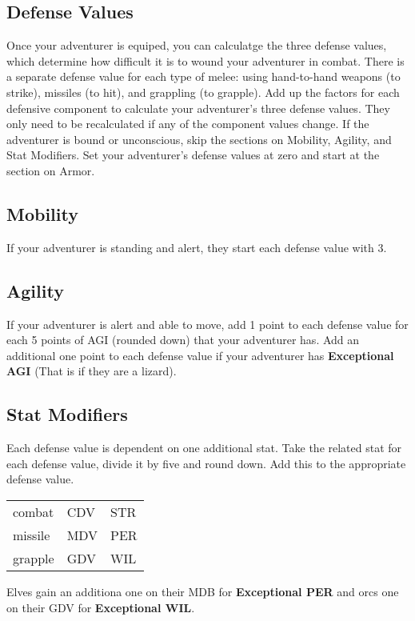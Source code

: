 \begin{multicols*}{2}
\section{Defense Values}
Once your adventurer is equiped, you can calculatge the three defense values, which determine how difficult it is to wound your adventurer in combat. There is a separate defense value for each type of melee: using hand-to-hand weapons (to strike), missiles (to hit), and grappling (to grapple). Add up the factors for each defensive component to calculate your adventurer's three defense values. They only need to be recalculated if any of the component values change.
If the adventurer is bound or unconscious, skip the sections on Mobility, Agility, and Stat Modifiers. Set your adventurer's defense values at zero and start at the section on Armor.
\subsection{Mobility}
If your adventurer is standing and alert, they start each defense value with 3.
\subsection{Agility}
If your adventurer is alert and able to move, add 1 point to each defense value for each 5 points of AGI (rounded down) that your adventurer has. Add an additional one point to each defense value if your adventurer has \textbf{Exceptional AGI} (That is if they are a lizard).
\subsection{Stat Modifiers}
Each defense value is dependent on one additional stat. Take the related stat for each defense value, divide it by five and round down. Add this to the appropriate defense value.
\begin{tcolorbox}[breakable,boxrule=0pt,title=\textbf{Melee Defense Stat Modifiers}]
\begin{tabular}{@{}l l l}
combat & CDV & STR\\
missile & MDV & PER\\
grapple & GDV & WIL\\
\end{tabular}
\end{tcolorbox}
Elves gain an additiona one on their MDB for \textbf{Exceptional PER} and orcs one on their GDV for \textbf{Exceptional WIL}.

\end{multicols*}
